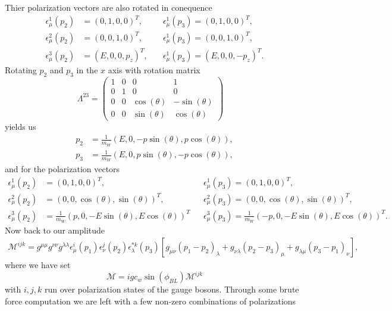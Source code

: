 \documentclass{report}
\newcommand{\nn}{\nonumber}
\numberwithin{equation}{section}
\begin{document}
Thier polarization vectors are also rotated in conequence
\begin{align}
\epsilon^1_\mu(p_2)&=(0,1,0,0)^T,\quad &\epsilon^1_\mu(p_3)=(0,1,0,0)^T,\nn\\
\epsilon^2_\mu(p_2)&=(0,0,1,0)^T,\quad &\epsilon^1_\mu(p_3)=(0,0,1,0)^T,\nn\\
\epsilon^3_\mu(p_2)&=(E,0,0,p_z)^T,\quad &\epsilon^1_\mu(p_3)=(E,0,0,-p_z)^T.
\end{align}
Rotating $p_2$ and $p_3$ in the $x$ axis with rotation matrix
\begin{equation}
\Lambda^{23}=\begin{pmatrix}
1&0&0&1\\
0&1&0&0\\
0&0&\cos(\theta)&-\sin(\theta)\\
0&0&\sin(\theta)&\cos(\theta)
\end{pmatrix}\quad
\end{equation}
yields us
\begin{align}
p_2&=\frac{1}{m_W}(E,0,-p \sin(\theta),p\cos(\theta)),\nn\\
p_3&=\frac{1}{m_W}(E,0,p \sin(\theta) ,-p\cos(\theta)),
\end{align}
and for the polarization vectors
\begin{align}
\epsilon^1_\mu(p_2)&=(0,1,0,0)^T,&&\epsilon^1_\mu(p_3)=(0,1,0,0)^T,\nn\\
\epsilon^2_\mu(p_2)&=(0,0,\cos(\theta),\sin(\theta))^T, &&\epsilon^2_\mu(p_3)=(0,0,\cos(\theta),\sin(\theta))^T,\nn\\
\epsilon^3_\mu(p_2)&=\frac{1}{m_W}(p,0,-E \sin(\theta),E \cos(\theta))^T &&\epsilon^3_\mu(p_3)=\frac{1}{m_W}(-p,0,-E \sin(\theta),E \cos(\theta))^T.
\end{align}
Now back to our amplitude
\begin{align}
\mathcal{M}^{ijk}=g^{\mu \mu} g^{\nu \nu}g^{\lambda \lambda}\epsilon^i_\mu(p_1) \epsilon^j_\nu(p_2) \epsilon^{*k}_\lambda(p_3)\left[g_{\mu\nu}(p_1-p_2)_\lambda+g_{\nu\lambda}(p_2-p_3)_\mu+g_{\lambda\mu}(p_3-p_1)_\nu\right],
\end{align}
where we have set
\begin{equation}
\mathcal{M}=i g c_w \sin(\phi_{BL}) \mathcal{M}^{ijk}
\end{equation}
with $i,j,k$ run over polarization states of the gauge bosons. Through some brute force computation we are left with a few non-zero combinations of polarizations
\end{document}
